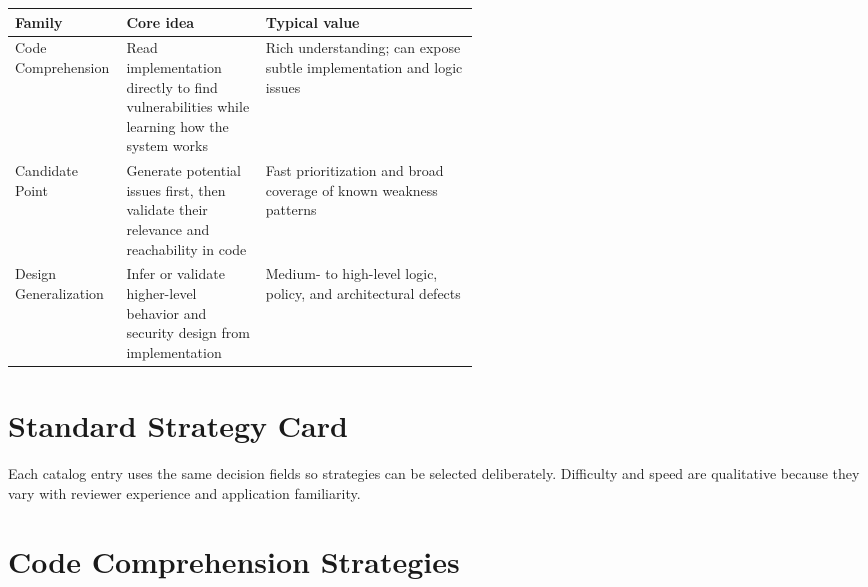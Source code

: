 \documentclass[10pt]{article}
\begin{document}
\par\smallskip\noindent\begin{tabularx}{\linewidth}{@{}L{0.24\linewidth}L{0.30\linewidth}Y@{}}
\toprule
Family & Core idea & Typical value \\
\midrule
Code Comprehension & Read implementation directly to find vulnerabilities while learning how the system works & Rich understanding; can expose subtle implementation and logic issues \\
Candidate Point & Generate potential issues first, then validate their relevance and reachability in code & Fast prioritization and broad coverage of known weakness patterns \\
Design Generalization & Infer or validate higher-level behavior and security design from implementation & Medium- to high-level logic, policy, and architectural defects \\
\bottomrule
\end{tabularx}

\section{Standard Strategy Card}
Each catalog entry uses the same decision fields so strategies can be selected deliberately. Difficulty and speed are qualitative because they vary with reviewer experience and application familiarity.
\clearpage

\section{Code Comprehension Strategies}

\end{document}
